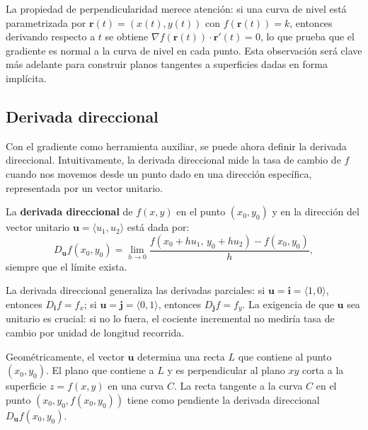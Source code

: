 \begin{rem}
La propiedad de perpendicularidad merece atención: si una curva de nivel
está parametrizada por $\mathbf{r}(t) = (x(t), y(t))$ con
$f(\mathbf{r}(t)) = k$, entonces derivando respecto a $t$ se obtiene
$\nabla f(\mathbf{r}(t))\cdot \mathbf{r}'(t) = 0$, lo que prueba que el
gradiente es normal a la curva de nivel en cada punto. Esta observación
será clave más adelante para construir planos tangentes a superficies
dadas en forma implícita.
\end{rem}

\subsection{Derivada direccional}

Con el gradiente como herramienta auxiliar, se puede ahora definir la
derivada direccional. Intuitivamente, la derivada direccional mide la
tasa de cambio de $f$ cuando nos movemos desde un punto dado en una
dirección específica, representada por un vector unitario.

\begin{definition}
La \textbf{derivada direccional} de $f(x,y)$ en el punto
$(x_0,y_0)$ y en la dirección del vector unitario
$\mathbf{u} = \langle u_1, u_2 \rangle$ está dada por:
\[
D_{\mathbf{u}} f(x_0,y_0)
= \lim_{h \to 0} \frac{f(x_0 + h u_1,\, y_0 + h u_2) - f(x_0,y_0)}{h},
\]
siempre que el límite exista.
\end{definition}

\begin{rem}
La derivada direccional generaliza las derivadas parciales: si
$\mathbf{u} = \mathbf{i} = \langle 1,0 \rangle$, entonces
$D_{\mathbf{i}} f = f_x$; si $\mathbf{u} = \mathbf{j} = \langle 0,1
\rangle$, entonces $D_{\mathbf{j}} f = f_y$. La exigencia de que
$\mathbf{u}$ sea unitario es crucial: si no lo fuera, el cociente
incremental no mediría tasa de cambio por unidad de longitud recorrida.
\end{rem}

Geométricamente, el vector $\mathbf{u}$ determina una recta $L$ que
contiene al punto $(x_0,y_0)$. El plano que contiene a $L$ y es
perpendicular al plano $xy$ corta a la superficie $z=f(x,y)$ en una
curva $C$. La recta tangente a la curva $C$ en el punto
$(x_0,y_0,f(x_0,y_0))$ tiene como pendiente la derivada direccional
$D_{\mathbf{u}} f(x_0,y_0)$.

